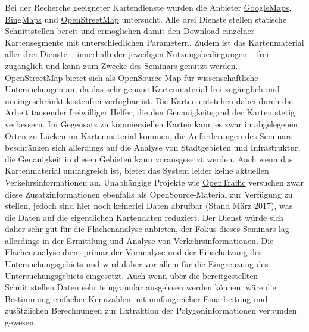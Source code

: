 Bei der Recherche geeigneter Kartendienste wurden die Anbieter \href{https://www.google.de/maps/}{GoogleMaps}, \href{https://www.bing.com/maps/}{BingMaps} und \href{http://www.openstreetmap.org/}{OpenStreetMap} untersucht. Alle drei Dienste stellen statische Schnittstellen bereit und ermöglichen damit den Download einzelner Kartensegmente mit unterschiedlichen Parametern. Zudem ist das Kartenmaterial aller drei Dienste -- innerhalb der jeweiligen Nutzungsbedingungen -- frei zugänglich und kann zum Zwecke des Seminars genutzt werden.\\

OpenStreetMap bietet sich als OpenSource-Map für wissenschaftliche Untersuchungen an, da das sehr genaue Kartenmaterial frei zugänglich und uneingeschränkt kostenfrei verfügbar ist. Die Karten entstehen dabei durch die Arbeit tausender freiwilliger Helfer, die den Genauigkeitsgrad der Karten stetig verbessern. Im Gegensatz zu kommerziellen Karten kann es zwar in abgelegenen Orten zu Lücken im Kartenmaterial kommen, die Anforderungen des Seminars beschränken sich allerdings auf die Analyse von Stadtgebieten und Infrastruktur, die Genauigkeit in diesen Gebieten kann vorausgesetzt werden. Auch wenn das Kartenmaterial umfangreich ist, bietet das System leider keine aktuellen Verkehrsinformationen an. Unabhängige Projekte wie \href{http://opentraffic.io/}{OpenTraffic} versuchen zwar diese Zusatzinformationen ebenfalls als OpenSource-Material zur Verfügung zu stellen, jedoch sind hier noch keinerlei Daten abrufbar (Stand März 2017), was die Daten auf die eigentlichen Kartendaten reduziert. Der Dienst würde sich daher sehr gut für die Flächenanalyse anbieten, der Fokus dieses Seminars lag allerdings in der Ermittlung und Analyse von  Verkehrsinformationen. Die Flächenanalyse dient primär der Voranalyse und der Einschätzung des Untersuchungsgebiets und wird daher vor allem für die Eingrenzung des Untersuchungsgebiets eingesetzt. Auch wenn über die bereitgestellten Schnittstellen Daten sehr feingranular ausgelesen werden können, wäre die Bestimmung einfacher Kennzahlen mit umfangreicher Einarbeitung und zusätzlichen Berechnungen zur Extraktion der Polygoninformationen verbunden gewesen.\\

